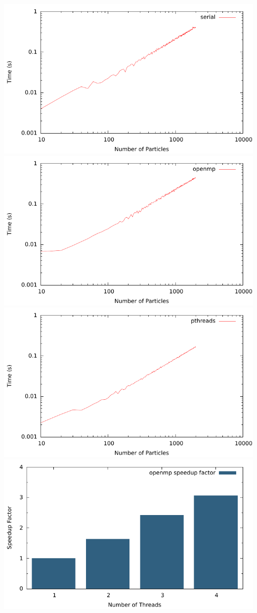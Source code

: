\documentclass[titlepage,a4paper,10pt]{article}
\begin{document}
\includegraphics{plots/serial.pdf}
\includegraphics{plots/openmp.pdf}
\includegraphics{plots/pthreads.pdf}
\includegraphics{plots/openmp_speedup.pdf}
\end{document}
